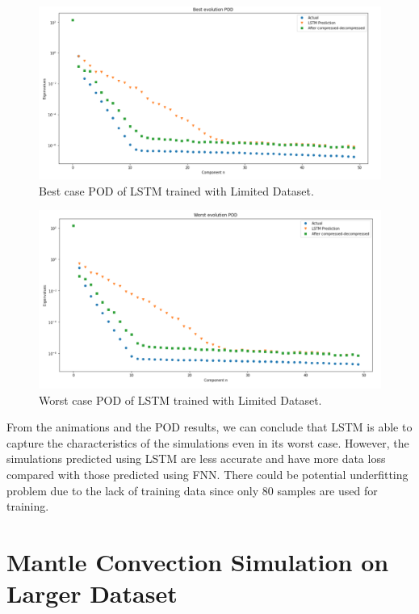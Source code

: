 \begin{figure}[H]
    \caption{Best case POD of LSTM trained with Limited Dataset.}
    \includegraphics[scale=0.5]{figures/mantle_convection_images/limited_dataset/LSTM_Best_POD.png}
\end{figure}

\begin{figure}[H]
    \caption{Worst case POD of LSTM trained with Limited Dataset.}
    \includegraphics[scale=0.5]{figures/mantle_convection_images/limited_dataset/LSTM_Worst_POD.png}
\end{figure}

From the animations and the POD results, we can conclude that LSTM is able to capture the characteristics of the simulations even in its worst case. However, the simulations predicted using LSTM are less accurate and have more data loss compared with those predicted using FNN. There could be potential underfitting problem due to the lack of training data since only 80 samples are used for training.


\section{Mantle Convection Simulation on Larger Dataset}

